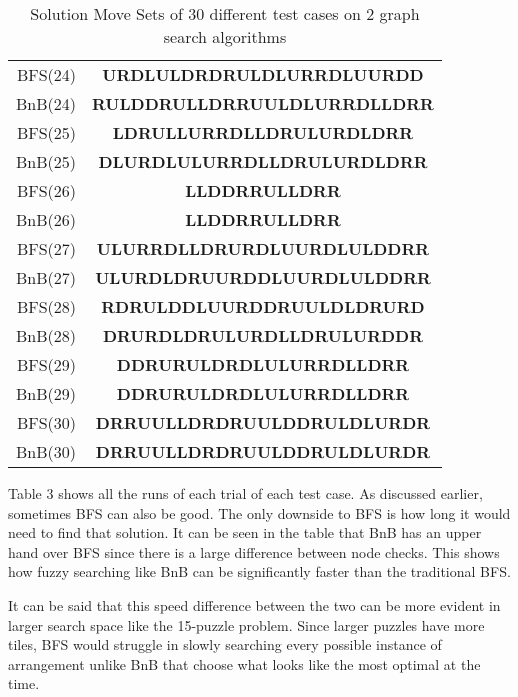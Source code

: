 \begin{table}[ht]
\begin{adjustbox}{width=0.6\textwidth,center}
\begin{tabular}{r|c}
BFS(24) & \textbf{URDLULDRDRULDLURRDLUURDD} \\
BnB(24) & \textbf{RULDDRULLDRRUULDLURRDLLDRR} \\ \hline

BFS(25) & \textbf{LDRULLURRDLLDRULURDLDRR} \\
BnB(25) & \textbf{DLURDLULURRDLLDRULURDLDRR} \\ \hline

BFS(26) & \textbf{LLDDRRULLDRR} \\
BnB(26) & \textbf{LLDDRRULLDRR} \\ \hline

BFS(27) & \textbf{ULURRDLLDRURDLUURDLULDDRR} \\
BnB(27) & \textbf{ULURDLDRUURDDLUURDLULDDRR} \\ \hline

BFS(28) & \textbf{RDRULDDLUURDDRUULDLDRURD} \\
BnB(28) & \textbf{DRURDLDRULURDLLDRULURDDR} \\ \hline

BFS(29) & \textbf{DDRURULDRDLULURRDLLDRR} \\
BnB(29) & \textbf{DDRURULDRDLULURRDLLDRR} \\ \hline

BFS(30) & \textbf{DRRUULLDRDRUULDDRULDLURDR} \\
BnB(30) & \textbf{DRRUULLDRDRUULDDRULDLURDR} \\

\end{tabular}
\end{adjustbox}

\caption{Solution Move Sets of 30 different test cases on 2 graph search algorithms}
\end{table}

\par Table 3 shows all the runs of each trial of each test case. As discussed earlier, sometimes BFS can also be good. The only downside to BFS is how long it would need to find that solution. It can be seen in the table that BnB has an upper hand over BFS since there is a large difference between node checks. This shows how fuzzy searching like BnB can be significantly faster than the traditional BFS.

\par It can be said that this speed difference between the two can be more evident in larger search space like the 15-puzzle problem. Since larger puzzles have more tiles, BFS would struggle in slowly searching every possible instance of arrangement unlike BnB that choose what looks like the most optimal at the time.

